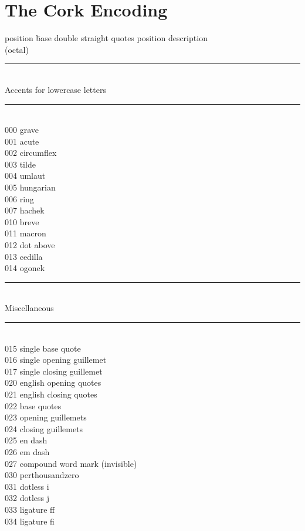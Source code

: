 \documentclass{article}
\renewcommand{\-}{\discretionary{\char'0177 }{}{}}
\begin{document}
\section{The Cork Encoding}
\begin{tabbing}
position \= base double straight quotes\kill
position \> description \\
(octal)  \>             \\
\rule{\linewidth}{.4pt}\>\\
Accents for lowercase letters\>\\
\rule{\linewidth}{.4pt}\>\\
000 \> grave \\
001 \> acute \\
002 \> circumflex\\
003 \> tilde \\
004 \> umlaut\\
005 \> hungarian \\
006 \> ring  \\
007 \> hachek\\
010 \> breve \\
011 \> macron\\
012 \> dot above \\
013 \> cedilla   \\
014 \> ogonek\\
\rule{\linewidth}{.4pt}\>\\
Miscellaneous\>\\
\rule{\linewidth}{.4pt}\>\\
015 \> single base quote \\
016 \> single opening guillemet \\
017 \> single closing guillemet \\
020 \> english opening quotes \\
021 \> english closing quotes \\
022 \> base quotes \\
023 \> opening guillemets \\
024 \> closing guillemets \\
025 \> en dash \\
026 \> em dash \\
027 \> compound word mark (invisible)\\
030 \> perthousandzero\\
031 \> dotless i\\
032 \> dotless j\\
033 \> ligature ff\\
034 \> ligature fi\\

\end{tabbing}
\end{document}
